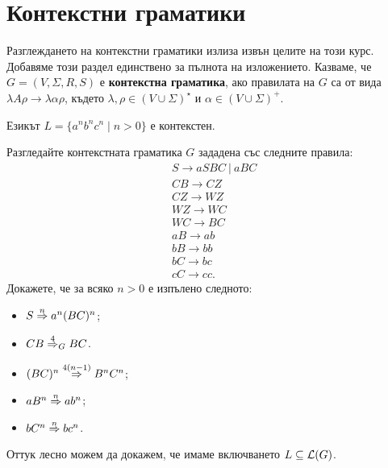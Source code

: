 \section{Контекстни граматики}

Разглеждането на контекстни граматики излиза извън целите на този курс. Добавяме този раздел единствено за пълнота на изложението.
Казваме, че $G = (V,\Sigma,R,S)$ е {\bf контекстна граматика}, ако правилата на $G$ са от вида
$\lambda A \rho \to \lambda \alpha \rho$, където $\lambda,\rho \in (V\cup\Sigma)^\star$ и $\alpha \in (V\cup\Sigma)^+$.

\begin{example}
  Езикът $L = \{a^nb^nc^n \mid n > 0\}$ е контекстен.
\end{example}

\begin{extra2}
  \begin{hint}
    Разгледайте контекстната граматика $G$ зададена със следните правила:
    \begin{align*}
      & S \to aSBC\ |\ aBC\\
      & CB \to CZ\\
      & CZ \to WZ\\
      & WZ \to WC\\
      & WC \to BC\\
      & aB \to ab\\
      & bB \to bb\\
      & bC \to bc\\
      & cC \to cc.
    \end{align*}
    Докажете, че за всяко $n > 0$ е изпълено следното:
    \begin{itemize}
    \item
      $S \stackrel{{n}}{\Rightarrow} a^n(BC)^n$;
    \item
      $CB \stackrel{{4}}{\Rightarrow}_G BC$.
    \item
      $(BC)^n \stackrel{{4(n-1)}}{\Rightarrow} B^nC^n$;
    \item
      $aB^n \stackrel{{n}}{\Rightarrow} ab^n$;
    \item
      $bC^n \stackrel{{n}}{\Rightarrow} bc^n$.
    \end{itemize}
    Оттук лесно можем да докажем, че имаме включването $L \subseteq \mathcal{L}(G)$.    
  \end{hint}
\end{extra2}



